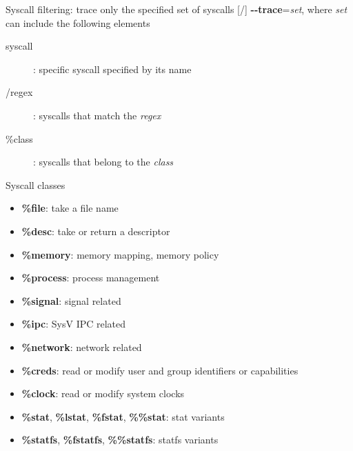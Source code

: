\documentclass[unicode,aspectratio=169,xcolor={table,dvipsnames,usernames}]{beamer}
\begin{document}
\begin{frame}{Syscall filtering: trace only the specified set of syscalls \hfill [\insertframenumber/\inserttotalframenumber]}
\textbf{-{}-trace}=\textit{set}, where \textit{set} can include the following elements
\begin{description}
	\item[syscall]: specific syscall specified by its name
	\item[/regex]: syscalls that match the \textit{regex}
	\item[\%class]: syscalls that belong to the \textit{class}
\end{description}
\scriptsize
\begin{block}{\large Syscall classes}
\begin{itemize}
\item \textbf{\%file}: take a file name
\item \textbf{\%desc}: take or return a descriptor
\item \textbf{\%memory}: memory mapping, memory policy
\item \textbf{\%process}: process management
\item \textbf{\%signal}: signal related
\item \textbf{\%ipc}: SysV IPC related
\item \textbf{\%network}: network related
\item \textbf{\%creds}: read or modify user and group identifiers or capabilities
\item \textbf{\%clock}: read or modify system clocks
\item \textbf{\%stat}, \textbf{\%lstat}, \textbf{\%fstat}, \textbf{\%\%stat}: stat variants
\item \textbf{\%statfs}, \textbf{\%fstatfs}, \textbf{\%\%statfs}: statfs variants
\end{itemize}
\end{block}
\end{frame}
\end{document}
